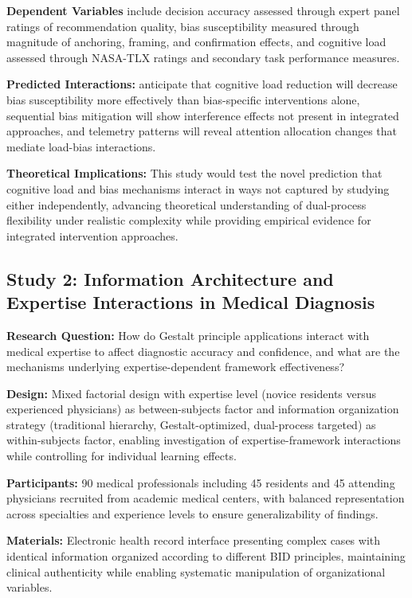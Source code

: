 \documentclass[
  authoryear,
  preprint]{elsarticle}
\begin{document}
\textbf{Dependent Variables} include decision accuracy assessed through
expert panel ratings of recommendation quality, bias susceptibility
measured through magnitude of anchoring, framing, and confirmation
effects, and cognitive load assessed through NASA-TLX ratings and
secondary task performance measures.

\textbf{Predicted Interactions:} anticipate that cognitive load
reduction will decrease bias susceptibility more effectively than
bias-specific interventions alone, sequential bias mitigation will show
interference effects not present in integrated approaches, and telemetry
patterns will reveal attention allocation changes that mediate load-bias
interactions.

\textbf{Theoretical Implications:} This study would test the novel
prediction that cognitive load and bias mechanisms interact in ways not
captured by studying either independently, advancing theoretical
understanding of dual-process flexibility under realistic complexity
while providing empirical evidence for integrated intervention
approaches.

\subsection{Study 2: Information Architecture and Expertise Interactions
in Medical
Diagnosis}\label{study-2-information-architecture-and-expertise-interactions-in-medical-diagnosis}

\textbf{Research Question:} How do Gestalt principle applications
interact with medical expertise to affect diagnostic accuracy and
confidence, and what are the mechanisms underlying expertise-dependent
framework effectiveness?

\textbf{Design:} Mixed factorial design with expertise level (novice
residents versus experienced physicians) as between-subjects factor and
information organization strategy (traditional hierarchy,
Gestalt-optimized, dual-process targeted) as within-subjects factor,
enabling investigation of expertise-framework interactions while
controlling for individual learning effects.

\textbf{Participants:} 90 medical professionals including 45 residents
and 45 attending physicians recruited from academic medical centers,
with balanced representation across specialties and experience levels to
ensure generalizability of findings.

\textbf{Materials:} Electronic health record interface presenting
complex cases with identical information organized according to
different BID principles, maintaining clinical authenticity while
enabling systematic manipulation of organizational variables.
\end{document}
